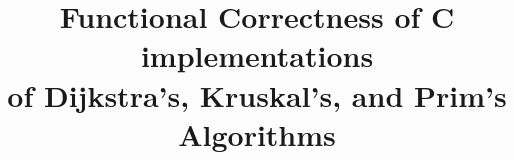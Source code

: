 \documentclass[runningheads]{llncs}
\title{Functional Correctness of C implementations \\
of Dijkstra's, Kruskal's, and Prim's Algorithms}
\newcommand\hide[1]{}
\begin{document}
\hide{
	\author{Anshuman Mohan \and
	Wei Xiang Leow \and
	Aquinas Hobor} %

	
	\institute{National University of Singapore}%
}
\author{ } \institute{ }
	\maketitle
	
	
	
	
	
	
	\vspace{-2em}
	
\end{document}

